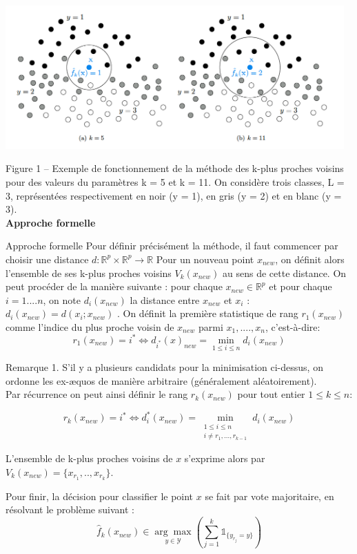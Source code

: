 \documentclass[a4paper]{article}
\theoremstyle{plain}
\begin{document}
\includegraphics[width=13cm]{Knn.png}

Figure 1 – Exemple de fonctionnement de la méthode des k-plus proches voisins pour des valeurs du
paramètres k = 5 et k = 11. On considère trois classes, L = 3, représentées respectivement en noir
(y = 1), en gris (y = 2) et en blanc (y = 3).\\

\textbf{Approche formelle}

Approche formelle
Pour définir précisément la méthode, il faut commencer par choisir une distance $d : \mathbb{R}^p \times \mathbb{R}^p \rightarrow \mathbb{R}$
Pour un nouveau point $x_{new}$, on définit alors l’ensemble de ses k-plus proches voisins $V_k(x_{new})$ au sens de cette distance. On peut procéder de la manière suivante : pour chaque $x_{new} \in \mathbb{R}^p$ et pour chaque $i = 1 .... n$,
on note $d_i(x_{new})$ la distance entre $x_{new}$ et $x_i$ : $d_i(x_{new}) = d(x_i; x_{new})$ . On définit la première statistique de rang $r_1(x_{new})$ comme l’indice du plus proche voisin de $x_{new}$ parmi $x_1,....,x_n$, c’est-à-dire:
$$ r_1(x_{new}) = i^{\ast} \Leftrightarrow d_{i^{\ast}}(x)_{new} = \min_{1\leq i \leq n} d_i(x_{new})$$


Remarque 1. S’il y a plusieurs candidats pour la minimisation ci-dessus, on ordonne les ex-æquos de manière arbitraire (généralement aléatoirement).\\

Par récurrence on peut ainsi définir le rang $r_k(x_{new})$ pour tout entier $1 \leq k \leq n $:

$$r_k(x_{new}) = i^{\ast} \Leftrightarrow d_i^{\ast}(x_{new}) = \min_{\substack{ 1\leq i \leq n \\ i\neq r_1,...,r_{k-1}}} d_i(x_{new}) $$

L’ensemble de k-plus proches voisins de $x$ s’exprime alors par $V_k(x_{new}) = \{x_{r_1},..,x_{r_k}\}$. 

Pour finir, la décision pour classifier le point $x$ se fait par vote majoritaire, en résolvant le problème suivant :
$$\hat f_k(x_{new}) \in \underset{y \in \mathcal{Y}}{\arg\max} \left( \sum_{j=1}^{k}\mathds{1}_{\{y_{r_j}=y\}}  \right)$$
\end{document}
